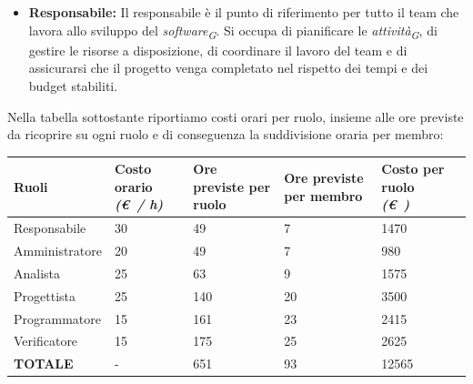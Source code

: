 \documentclass{article}
\begin{document}
\begin{itemize}
\begin{itemize}
        \item \textbf{Responsabile:} Il responsabile è il punto di riferimento per tutto il team che lavora allo sviluppo del \textit{software}\textsubscript{\textit{G}}. Si occupa di pianificare le \textit{attività}\textsubscript{\textit{G}}, di gestire le risorse a disposizione, di coordinare il lavoro del team e di assicurarsi che il progetto venga completato nel rispetto dei tempi e dei budget stabiliti.
    \end{itemize}
    \pagebreak
    Nella tabella sottostante riportiamo costi orari per ruolo, insieme alle ore previste da ricoprire su ogni ruolo e di conseguenza la suddivisione oraria per membro:
    \vspace{0.5cm}
    \begin{center}
        
    \begin{tabular}{|C{3cm}|C{2cm}|C{2cm}|C{2cm}|C{2cm}|C{2cm}|}
        \hline

        \textbf{Ruoli} & \textbf{Costo orario} \linebreak \textit{(\euro\ / h)} & \textbf{Ore previste per ruolo} & \textbf{Ore previste per membro} & \textbf{Costo per ruolo} \linebreak \textit{(\euro\ )} \\
        \hline\hline
        
        Responsabile & 30 & 49 & 7 & 1470\\
        \hline
        
        Amministratore & 20 & 49 & 7 & 980\\
        \hline
        
        Analista & 25 & 63 & 9 & 1575\\
        \hline 
        
        Progettista & 25 & 140 & 20 & 3500\\ 
        \hline
        
        Programmatore & 15 & 161 & 23 & 2415\\
        \hline
        
        Verificatore & 15 & 175 & 25 & 2625\\
        \hline\hline
        
        \textbf{TOTALE} & - & 651 & 93 & 12565\\
        \hline
    \end{tabular}
    \end{center}

    
    \vspace{0.5cm}


\end{itemize}
\end{document}

